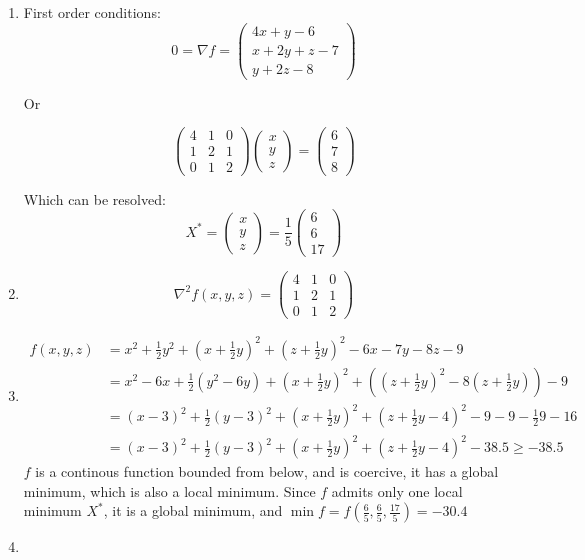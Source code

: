 \documentclass[12pt]{article}
\begin{document}
\begin{enumerate}
\item First order conditions:
\[
0 = \nabla f = \left( 
\begin{array}{c} 
4x + y - 6\\
x + 2y + z - 7 \\
y + 2z - 8
\end{array}
\right)
\]

Or 

\[
\left( 
\begin{array}{ccc} 
4&1&0\\
1&2&1 \\
0&1&2
\end{array}
\right)
\left( 
\begin{array}{c} 
x\\y\\z
\end{array}
\right)
=
\left( 
\begin{array}{c} 
6\\7\\8
\end{array}
\right)
\]


Which can be resolved:
\[
X^* = 
\left( 
\begin{array}{c} 
x\\y\\z
\end{array}
\right)
=
\frac15
\left( 
\begin{array}{c} 
6\\6\\17
\end{array}
\right)
\]


\item 

\[
\nabla^2 f(x,y,z) = \left(
\begin{array}{ccc}
4 & 1 & 0 \\
1 & 2 & 1 \\
0 & 1 & 2
\end{array}
\right)
\]


\item 

\begin{align*}
f(x,y,z) &=  x^2 + \frac12 y^2 + (x+\frac12 y)^2 + (z+\frac12 y)^2- 6x -7y - 8z - 9
\\&= x^2 - 6x + \frac12 (y^2 - 6 y) + (x+\frac12 y)^2 + ( (z+\frac12 y)^2  - 8(z+\frac12y) )  - 9
\\&= (x-3)^2 + \frac12 (y-3)^2 + (x+\frac12 y)^2 + (z+\frac12y - 4)^2 - 9 - 9 - \frac12 9 - 16
\\&= (x-3)^2 + \frac12 (y-3)^2 + (x+\frac12 y)^2 + (z+\frac12y - 4)^2 - 38.5 \ge -38.5
\end{align*}
$f$ is a continous function bounded from below, and is coercive, it has a global minimum, which is also a local minimum. 
Since $f$ admits only one local minimum $X^*$, it is a global minimum, and $\min f = f(\frac{6}{5}, \frac65, \frac{17}5) = -30.4$

\item 



\end{enumerate}
\end{document}
